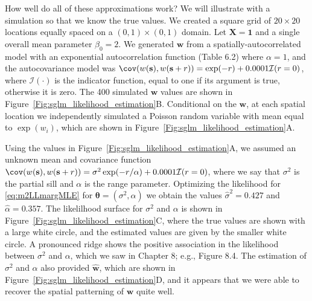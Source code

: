 \documentclass[12pt, titlepage]{article}
\begin{document}
How well do all of these approximations work?  We will illustrate with a simulation so that we know the true values.  We created a square grid of $20 \times 20$ locations equally spaced on a $(0,1) \times (0,1)$ domain. Let $\mathbf{X} = \mathbf{1}$ and a single overall mean parameter $\beta_{0} = 2$.  We generated $\mathbf{w}$ from a spatially-autocorrelated model with an exponential autocorrelation function (Table 6.2) where $\alpha = 1$, and the autocovariance model was $\cov(w(\mathbf{s}),w(\mathbf{s} + r)) = \exp(-r) + 0.0001\mathcal{I}(r = 0)$, where $\mathcal{I}(\cdot)$ is the indicator function, equal to one if its argument is true, otherwise it is zero.  The 400 simulated $\mathbf{w}$ values are shown in Figure~\ref{Fig:sglm_likelihood_estimation}B.  Conditional on the $\mathbf{w}$, at each spatial location we independently simulated a Poisson random variable with mean equal to $\exp(w_{i})$, which are shown in Figure~\ref{Fig:sglm_likelihood_estimation}A.

Using the values in Figure~\ref{Fig:sglm_likelihood_estimation}A, we assumed an unknown mean and covariance function $\cov(w(\mathbf{s}),w(\mathbf{s} + r)) = \sigma^{2}\exp(-r/\alpha) + 0.0001\mathcal{I}(r = 0)$, where we say that $\sigma^{2}$ is the partial sill and $\alpha$ is the range parameter.  Optimizing the likelihood for \eqref{eq:m2LLmargMLE} for $\boldsymbol{\theta} = (\sigma^{2},\alpha)$ we obtain the values $\hat{\sigma}^{2} = 0.427$ and $\hat{\alpha} = 0.357$.  The likelilhood surface for $\sigma^{2}$ and $\alpha$ is shown in Figure~\ref{Fig:sglm_likelihood_estimation}C, where the true values are shown with a large white circle, and the estimated values are given by the smaller white circle.  A pronounced ridge shows the positive association in the likelihood between $\sigma^{2}$ and $\alpha$, which we saw in Chapter 8; e.g., Figure 8.4. The estimation of $\sigma^{2}$ and $\alpha$ also provided $\hat{\mathbf{w}}$, which are shown in Figure~\ref{Fig:sglm_likelihood_estimation}D, and it appears that we were able to recover the spatial patterning of $\mathbf{w}$ quite well.
\end{document}
